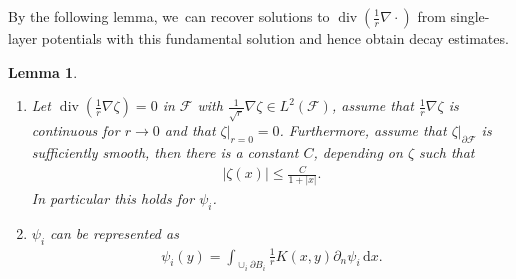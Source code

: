 \documentclass[JEP,XML,SOM,Unicode,published]{cedram}
\newtheorem{lemma}[theorem]{Lemma}
\theoremstyle{definition}
\renewcommand{\div}{\operatorname{div}}
\newcommand\eq{=}
\newcommand\dd{\,\mathrm{d}}
\newcommand\dx{\dd x}
\let\de\partial
\begin{document}
By the following lemma, we~can recover solutions to $\div(\frac{1}{r}\nabla\cdot)$ from single-layer potentials with this fundamental solution and hence obtain decay estimates.

\skpt
\begin{lemma}\label{rep psi}
\begin{enumerate}
\item\label{rep psia}
Let $\div(\frac{1}{r}\nabla\zeta)=0$ in $\mathcal{F}$ with $\frac{1}{\sqrt{r}}\nabla\zeta\in L^2(\mathcal{F})$, assume that $\frac{1}{r}\nabla\zeta$ is continuous for $r\to 0$ and that $\zeta|_{r=0}=0$. Furthermore, assume that $\zeta|_{\de\mathcal{F}}$ is sufficiently smooth, then there is a constant $C$, depending on $\zeta$ such that
\begin{align*}
|\zeta(x)|\leq \frac{C}{1+|x|}.
\end{align*}
In particular this holds for $\psi_i$.
\item\label{rep psib}
$\psi_i$ can be represented as
\begin{align*}
\psi_i(y)\eq\int_{\cup_i\de B_i}\frac{1}{r}K(x,y)\de_n\psi_i\dx.
\end{align*}
\end{enumerate}
\end{lemma}
\end{document}
